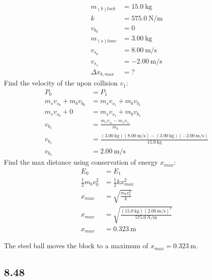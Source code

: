 \documentclass{article}
\begin{document}
\begin{align*}
	m_{(b)lock} & = \SI{15.0}{\kilogram} \\
	k & = \SI{575.0}{\newton \per \meter} \\
	v_{b_0} & = 0 \\
	m_{(s)tone} & = \SI{3.00}{\kilogram} \\
	v_{s_0} & = \SI{8.00}{\meter \per \second} \\
	v_{s_1} & = \SI{-2.00}{\meter \per \second} \\
	\Delta x_{b,max} & = ?
\end{align*}
Find the velocity of the upon collision $ v_1 $:
\begin{align*}
	P_0 & = P_1 \\
	m_sv_{s_0} + m_bv_{b_0} & = m_sv_{s_1} + m_bv_{b_1} \\
	m_sv_{s_0} + 0 & = m_sv_{s_1} + m_bv_{b_1} \\
	v_{b_1} & = \frac{ m_sv_{s_0} - m_sv_{s_1} }{ m_b } \\
	v_{b_1} & = \frac{ (\SI{3.00}{\kilogram})(\SI{8.00}{\meter \per \second}) - (\SI{3.00}{\kilogram})(\SI{-2.00}{\meter \per \second}) }{ \SI{15.0}{\kilogram} } \\
	v_{b_1} & = \SI{2.00}{\meter \per \second}
\end{align*}
Find the max distance using conservation of energy $ x_{max} $:
\begin{align*}
	E_0 & = E_1 \\
	\frac{1}{2}m_bv_0^2 & = \frac{1}{2}kx_{max}^2 \\
	x_{max} & = \sqrt{ \frac{ m_bv_0^2 }{ k } } \\
	x_{max} & = \sqrt{ \frac{ (\SI{15.0}{\kilogram})(\SI{2.00}{\meter \per \second})^2 }{ \SI{575.0}{\newton \per \meter} } } \\
	x_{max} & = \SI{0.323}{\meter}
\end{align*}
\begin{mdframed}
	The steel ball moves the block to a maximum of $ x_{max} = \SI{0.323}{\meter} $.
\end{mdframed}

\subsection{8.48}
\end{document}
